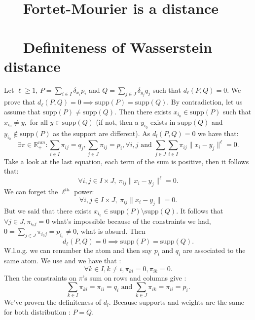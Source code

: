 \documentclass{amsart}
\newcommand{\RR}{\mathbb{R}}
\begin{document}
\begin{appendices}
    
\section{$\quad$ Fortet-Mourier is a distance}\label{appendix metric}

\section{$\quad$ Definiteness of Wasserstein distance}\label{definiteness}
\noindent Let $\ell\geq 1$, $P=\sum_{i\in I}\delta_{x_i}p_i$ and $Q=\sum_{j\in J}\delta_{y_j}q_j$ such that $d_\ell\left(P,Q\right)=0$. We prove that $d_\ell\left(P,Q\right)=0\implies \text{supp}\left(P\right)=\text{supp}\left(Q\right)$. By contradiction, let us assume that $\text{supp}\left(P\right)\ne\text{supp}\left(Q\right)$. Then there exists $x_{i_0}\in \text{supp}\left(P\right)$ such that $x_{i_0}\neq y,$ for all $ y\in\text{supp}\left(Q\right)$ (if not, then a $y_{i_0}$ exists in $\text{supp}\left(Q\right)$ and $y_{i_0}\notin \text{supp}\left(P\right)$ as the support are different). As $d_l\left(P,Q\right)=0$ we have that:$$
    \exists\pi\in\RR^{nm}_+ : \sum_{i\in I}\pi_{ij}=q_j, \sum_{j\in J}\pi_{ij}=p_i, \forall i,j \text{ and } \sum_{j\in J}\sum_{i\in I}\pi_{ij}\lVert x_i-y_j\rVert^\ell=0.
    $$
Take a look at the last equation, each term of the sum is positive, then it follows that:
    \begin{equation}\label{useful}
    \forall i,j \in I\times J, \: \pi_{ij}\lVert x_i-y_j\rVert^\ell=0.
    \end{equation}
    We can forget the $\ell^{th}$ power:
    $$
     \forall i,j \in I\times J, \: \pi_{ij}\lVert x_i-y_j\rVert=0.
    $$
    But we said that there exists $x_{i_0}\in\text{supp}\left(P\right)\setminus\text{supp}\left(Q\right)$. It follows that $\forall j\in J, \pi_{i_0j}=0$ what's impossible because of the constraints we had, $0=\sum_{j\in J}\pi_{i_0j}=p_{i_0}\neq0$, what is absurd. Then $$d_\ell\left(P,Q\right)=0\implies \text{supp}\left(P\right)=\text{supp}\left(Q\right).$$
    W.l.o.g. we can renumber the atom and then say $p_i$ and $q_i$ are associated to the same atom. We use  and we have that :
    $$
    \forall k\in I, k\neq i, \pi_{ki}=0, \pi_{ik}=0.
    $$
    Then the constraints on $\pi$'s sum on rows and columns give  : $$ 
    \sum_{k\in I}\pi_{ki}=\pi_{ii}=q_i \text{ and } \sum_{k\in J}\pi_{ik}=\pi_{ii}=p_i.
    $$
    We've proven the definiteness of $d_l$. Because supports and weights are the same for both distribution : $P=Q$.


\end{appendices}
\end{document}
